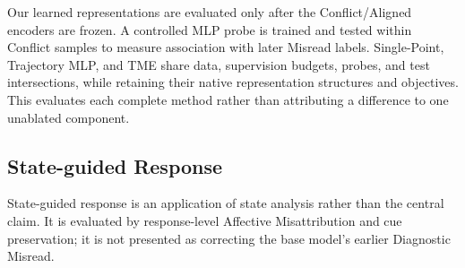 Our learned representations are evaluated only after the Conflict/Aligned encoders
are frozen. A controlled MLP probe is trained and tested within Conflict samples to
measure association with later Misread labels. Single-Point, Trajectory MLP, and TME
share data, supervision budgets, probes, and test intersections, while retaining
their native representation structures and objectives. This evaluates each complete
method rather than attributing a difference to one unablated component.

\subsection{State-guided Response}

State-guided response is an application of state analysis rather than the central
claim. It is evaluated by response-level Affective Misattribution and cue preservation;
it is not presented as correcting the base model's earlier Diagnostic Misread.
